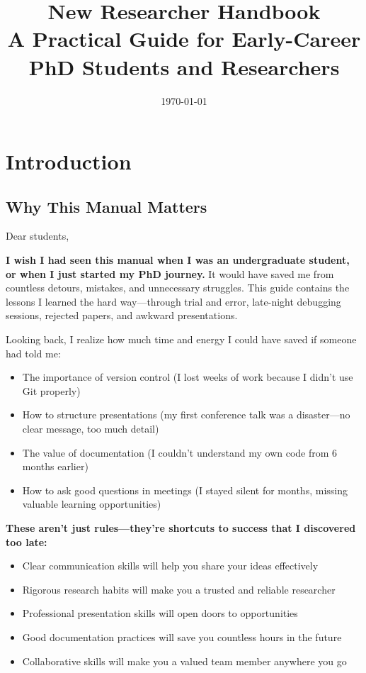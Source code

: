 \documentclass[11pt,a4paper]{article}
\title{\textbf{New Researcher Handbook}\\
\large A Practical Guide for Early-Career PhD Students and Researchers}
\author{\href{https://aaronluo00.github.io/Aaron_Homepage/}{Xiaolong Luo}\\
Harvard University\\
School of Engineering and Applied Sciences\\
\vspace{0.5cm}
\small\textit{Also available on: \href{http://xhslink.com/m/5E5I3850qZP}{Xiaohongshu \begin{CJK}{UTF8}{gbsn}(小红书)\end{CJK}}}}
\date{\today}
\begin{document}
\maketitle

\tableofcontents
\newpage

\section{Introduction}

\subsection{Why This Manual Matters}

Dear students,

\textbf{I wish I had seen this manual when I was an undergraduate student, or when I just started my PhD journey.} It would have saved me from countless detours, mistakes, and unnecessary struggles. This guide contains the lessons I learned the hard way—through trial and error, late-night debugging sessions, rejected papers, and awkward presentations.

Looking back, I realize how much time and energy I could have saved if someone had told me:
\begin{itemize}
    \item The importance of version control (I lost weeks of work because I didn't use Git properly)
    \item How to structure presentations (my first conference talk was a disaster—no clear message, too much detail)
    \item The value of documentation (I couldn't understand my own code from 6 months earlier)
    \item How to ask good questions in meetings (I stayed silent for months, missing valuable learning opportunities)
\end{itemize}

\textbf{These aren't just rules—they're shortcuts to success that I discovered too late:}
\begin{itemize}
    \item Clear communication skills will help you share your ideas effectively
    \item Rigorous research habits will make you a trusted and reliable researcher
    \item Professional presentation skills will open doors to opportunities
    \item Good documentation practices will save you countless hours in the future
    \item Collaborative skills will make you a valued team member anywhere you go
\end{itemize}
\end{document}
